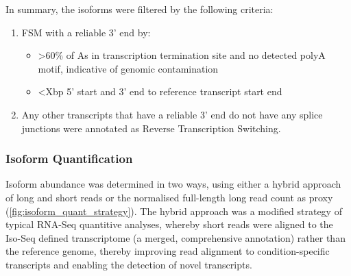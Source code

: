 
In summary, the isoforms were filtered by the following criteria: 
\begin{enumerate}
	\item FSM with a reliable 3’ end by:
	\begin{itemize}
		\item >60\% of As in transcription termination site and no detected polyA motif, indicative of genomic contamination
		\item <Xbp 5' start and 3’ end to reference transcript start end
	\end{itemize}
	\item Any other transcripts that have a reliable 3' end do not have any splice junctions were annotated as Reverse Transcription Switching. 
\end{enumerate}

\subsubsection{Isoform Quantification}
Isoform abundance was determined in two ways, using either a hybrid approach of long and short reads or the normalised full-length long read count as proxy (\cref{fig:isoform_quant_strategy}). The hybrid approach was a modified strategy of typical RNA-Seq quantitive analyses, whereby short reads were aligned to the Iso-Seq defined transcriptome (a merged, comprehensive annotation) rather than the reference genome, thereby improving read alignment to condition-specific transcripts and enabling the detection of novel transcripts. 


